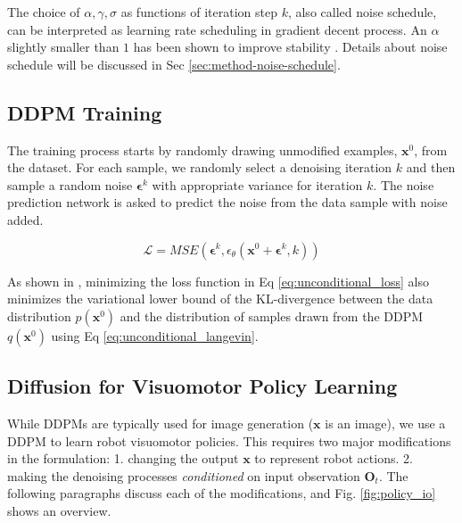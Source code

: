 \documentclass[Afour,sageh,times]{sagej}
\begin{document}
The choice of $\alpha,\gamma,\sigma$ as functions of iteration step $k$, also called noise schedule, can be interpreted as learning rate scheduling in gradient decent process.
An $\alpha$ slightly smaller than $1$ has been shown to improve stability \cite{ho2020denoising}.
Details about noise schedule will be discussed in Sec \ref{sec:method-noise-schedule}.


\subsection{DDPM Training}
\label{sec:ddpm_inference}


The training process starts by randomly drawing unmodified examples, $\mathbf{x}^0$, from the dataset. For each sample, we randomly select a denoising iteration $k$ and then sample a random noise $\mathbf{\epsilon}^k$ with appropriate variance for iteration $k$. The noise prediction network is asked to predict the noise from the data sample with noise added.

\vspace{-2mm}
\begin{equation}
    \mathcal{L} = MSE(\mathbf{\epsilon}^k, \epsilon_\theta(\mathbf{x}^0+\mathbf{\epsilon}^k,k))
    \label{eq:unconditional_loss}
\end{equation}

As shown in \cite{ho2020denoising}, minimizing the loss function in Eq \ref{eq:unconditional_loss} also minimizes the variational lower bound of the KL-divergence between the data distribution $p(\mathbf{x}^0)$ and the distribution of samples drawn from the DDPM $q(\mathbf{x}^0)$ using Eq \ref{eq:unconditional_langevin}.







\subsection{Diffusion for Visuomotor Policy Learning}

While DDPMs are typically used for image generation ($\mathbf{x}$ is an image), we use a DDPM to learn robot visuomotor policies. This requires two major modifications in the formulation:
1. changing the output $\mathbf{x}$  to represent robot actions.
2. making the denoising processes \textit{conditioned} on input observation $\mathbf{O}_t$.
The following paragraphs discuss each of the modifications, and Fig. \ref{fig:policy_io} shows an overview.
\end{document}
